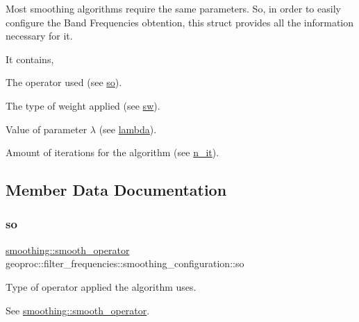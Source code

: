 Most smoothing algorithms require the same parameters. So, in order to easily configure the Band Frequencies obtention, this struct provides all the information necessary for it.

It contains,
\begin{DoxyItemize}
\item The operator used (see \hyperlink{structgeoproc_1_1filter__frequencies_1_1smoothing__configuration_af5f701a4b1af506bd9be68e3c5da8d44}{so}).
\item The type of weight applied (see \hyperlink{structgeoproc_1_1filter__frequencies_1_1smoothing__configuration_a62aba82705c2fa9308d7e225456be7b7}{sw}).
\item Value of parameter $\lambda$ (see \hyperlink{structgeoproc_1_1filter__frequencies_1_1smoothing__configuration_ad6e8e5ebdd18c3d013e4fbbc3d965dfa}{lambda}).
\item Amount of iterations for the algorithm (see \hyperlink{structgeoproc_1_1filter__frequencies_1_1smoothing__configuration_aa9f5a87ca7e0084e9ac6f3c40d30310c}{n\+\_\+it}). 
\end{DoxyItemize}

\subsection{Member Data Documentation}
\mbox{\label{structgeoproc_1_1filter__frequencies_1_1smoothing__configuration_af5f701a4b1af506bd9be68e3c5da8d44}} 
\subsubsection{\texorpdfstring{so}{so}}
{\footnotesize\ttfamily \hyperlink{namespacegeoproc_1_1smoothing_a64c2bfd1dda6cfbf39afa2e61fd62537}{smoothing\+::smooth\+\_\+operator} geoproc\+::filter\+\_\+frequencies\+::smoothing\+\_\+configuration\+::so}



Type of operator applied the algorithm uses. 

See \hyperlink{namespacegeoproc_1_1smoothing_a64c2bfd1dda6cfbf39afa2e61fd62537}{smoothing\+::smooth\+\_\+operator}. \mbox{\label{structgeoproc_1_1filter__frequencies_1_1smoothing__configuration_a62aba82705c2fa9308d7e225456be7b7}} 
